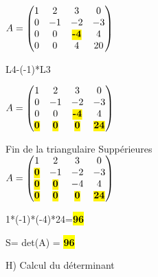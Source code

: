 $
A =
\begin{pmatrix}
  1 & 2 & 3 & 0    \\
  0 & -1 & -2 & -3 \\
  0 & 0 & \hl{\textbf{-4}} & 4   \\
  0 & 0 & 4 & 20  \\
\end{pmatrix}
$

\vspace{5mm} %

L4-(-1)*L3\\

\vspace{5mm} %

$
A =
\begin{pmatrix}
  1 & 2 & 3 & 0    \\
  0 & -1 & -2 & -3 \\
  0 & 0 & \hl{\textbf{-4}} & 4   \\
  \hl{\textbf{0}} & \hl{\textbf{0}} & \hl{\textbf{0}} & \hl{\textbf{24}}  \\
\end{pmatrix}
$

\vspace{5mm} %
Fin de la triangulaire Suppérieures \\

$
A =
\begin{pmatrix}
  1 & 2 & 3 & 0    \\
  \hl{\textbf{0}} & -1 & -2 & -3 \\
  \hl{\textbf{0}} & \hl{\textbf{0}} & -4 & 4   \\
  \hl{\textbf{0}} & \hl{\textbf{0}} & \hl{\textbf{0}} & \hl{\textbf{24}}  \\
\end{pmatrix}
$

\vspace{5mm} %

1*(-1)*(-4)*24=\hl{\textbf{96}} \\

\vspace{4mm} %

S= det(A) = \hl{\textbf{96}} \\

\newpage

H) Calcul du déterminant

\vspace{5mm} %

